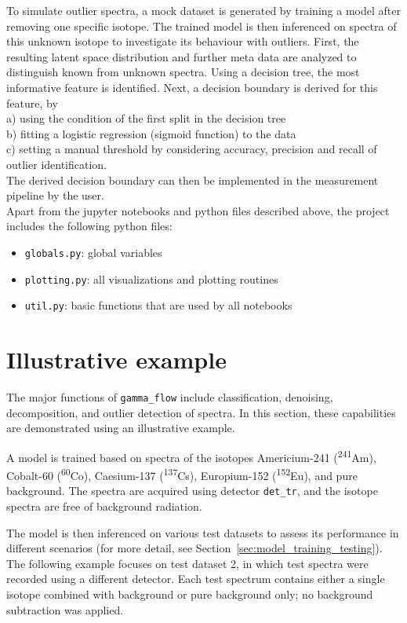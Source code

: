 \documentclass[preprint, 12pt, a4paper]{elsarticle}
\begin{document}
To simulate outlier spectra, a mock dataset is generated by training a model after removing one specific isotope. The trained model is then inferenced on spectra of this unknown isotope to investigate its behaviour with outliers. 
First, the resulting latent space distribution and further meta data are analyzed to distinguish known from unknown spectra. Using a decision tree, the most informative feature is identified. 
Next, a decision boundary is derived for this feature, by  \\
a) using the condition of the first split in the decision tree \\
b) fitting a logistic regression (sigmoid function) to the data \\ 
c) setting a manual threshold by considering accuracy, precision and recall of outlier identification. \\
The derived decision boundary can then be implemented in the measurement pipeline by the user. \\


Apart from the jupyter notebooks and python files described above, the project includes the following python files:  
\begin{itemize}
\item \texttt{globals.py}: global variables  
\item \texttt{plotting.py}: all visualizations and plotting routines    
\item \texttt{util.py}: basic functions that are used by all notebooks  
\end{itemize}


\section{Illustrative example}

The major functions of \texttt{gamma\_flow} include classification, denoising, decomposition, and outlier detection of spectra. In this section, these capabilities are demonstrated using an illustrative example. 

A model is trained based on spectra of the isotopes Americium-241 (\textsuperscript{241}Am), Cobalt-60 (\textsuperscript{60}Co), Caesium-137 (\textsuperscript{137}Cs), Europium-152 (\textsuperscript{152}Eu), and pure background. The spectra are acquired using detector \texttt{det\_tr}, and the isotope spectra are free of background radiation.

The model is then inferenced on various test datasets to assess its performance in different scenarios (for more detail, see Section~\ref{sec:model_training_testing}). The following example focuses on test dataset 2, in which test spectra were recorded using a different detector. Each test spectrum contains either a single isotope combined with background or pure background only; no background subtraction was applied.
\end{document}
